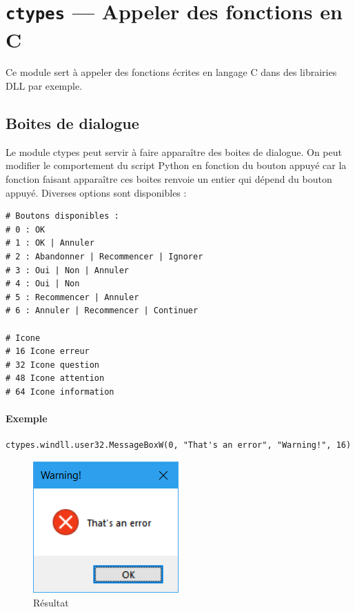 \documentclass[a4paper, 10pt]{article}
\begin{document}
\section[{\footnotesize\texttt{ctypes}} --- Appeler des fonctions en C]{{\normalfont\bfseries\large\texttt{ctypes}} --- Appeler des fonctions en C}
Ce module sert à appeler des fonctions écrites en langage C dans des librairies DLL par exemple.
\subsection{Boites de dialogue}
Le module ctypes peut servir à faire apparaître des boites de dialogue. On peut modifier le comportement du script Python en fonction du bouton appuyé car la fonction faisant apparaître ces boites renvoie un entier qui dépend du bouton appuyé. Diverses options sont disponibles :
\begin{verbatim}
# Boutons disponibles :
# 0 : OK
# 1 : OK | Annuler
# 2 : Abandonner | Recommencer | Ignorer
# 3 : Oui | Non | Annuler
# 4 : Oui | Non
# 5 : Recommencer | Annuler
# 6 : Annuler | Recommencer | Continuer

# Icone
# 16 Icone erreur
# 32 Icone question
# 48 Icone attention
# 64 Icone information
\end{verbatim}

\paragraph{Exemple}
\begin{verbatim}
ctypes.windll.user32.MessageBoxW(0, "That's an error", "Warning!", 16)
\end{verbatim}
\begin{figure}[h]
    \begin{center}
        \includegraphics[scale=0.5]{errorwindow.png}
        \caption*{Résultat}
    \end{center}
\end{figure}
\end{document}
